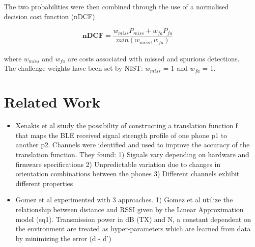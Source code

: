 \documentclass[conference]{IEEEtran}
\begin{document}
The two probabilities were then combined through the use of a normalised decision cost function (nDCF)

\begin{equation} \label{nDCF}
{\mathbf{\textbf{nDCF}} ={\frac{w_{miss} P_{miss} +w_{fa} P_{fa}}{min(w_{miss} , w_{fa})}}}
\end{equation}
\\
where $w_{miss}$ and $w_{fa}$ are costs associated with missed and spurious detections. The challenge weights have been set by NIST: $w_{miss}$ = 1 and $w_{fa}$ = 1. \cite{b7} \cite{b8} 
\vspace{0.25cm}
\section{Related Work}
\begin{itemize}
\item Xenakis et al study the possibility of constructing a translation function f that maps the BLE received signal strength profile of one phone p1 to another p2. Channels were identified and used to improve the accuracy of the translation function. They found: 1) Signals vary depending on hardware and firmware specifications 2) Unpredictable variation due to changes in orientation combinations between the phones 3) Different channels exhibit different properties

\item Gomez et al\cite{b2} experimented with 3 approaches. 1) Gomez et al utilize the relationship between distance and RSSI given by the Linear Approximation model (eq1). Transmission power in dB (TX) and N, a constant dependent on the environment are treated as hyper-parameters which are learned from data by minimizing the error (d - d’)\\


\end{itemize}
\end{document}
